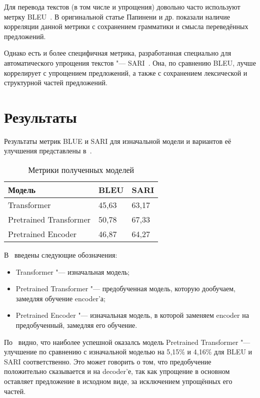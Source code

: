 Для перевода текстов (в том числе и упрощения) довольно часто используют метрку BLEU~\cite{BLEU}.
В оригинальной статье Папинени и др. показали наличие корреляции данной метрики с сохранением грамматики и смысла переведённых предложений.

Однако есть и более специфичная метрика, разработанная специально для автоматического упрощения текстов "--- SARI~\cite{SARI}.
Она, по сравнению BLEU, лучше коррелирует с упрощением предложений, а также с сохранением лексической и структурной частей предложений.


\section{Результаты}


Результаты метрик BLUE и SARI для изначальной модели и вариантов её улучшения представлены в~.

\begin{table}[H]%
  \centering\small
  \caption{Метрики полученных моделей}
  \label{metrics}
    \begin{tabular}{|l|l|l|}
      \hline
      \textbf{Модель} & \textbf{BLEU} & \textbf{SARI} \\ \hline
      Transformer & 45{,}63 & 63{,}17 \\ \hline
      Pretrained Transformer & 50{,}78 & 67{,}33 \\ \hline
      Pretrained Encoder & 46{,}87 & 64{,}27 \\ \hline
    \end{tabular}
    \normalsize
\end{table}

В~ введены следующие обозначения:
\begin{itemize}%
  \item Transformer "--- изначальная модель;
  \item Pretrained Transformer "--- предобученная модель, которую дообучаем, замедляя обучение encoder'а;
  \item Pretrained Encoder "--- изначальная модель, в которой заменяем encoder на предобученный, замедляя его обучение.
\end{itemize}

По~ видно, что наиболее успешной оказалсь модель Pretrained Transformer "--- улучшение по сравнению с изначальной моделью на 5{,}15\% и 4{,}16\% для BLEU и SARI соответственно.
Это может говорить о том, что предобучение положительно сказывается и на decoder'е, так как упрощение в основном оставляет предложение в исходном виде, за исключением упрощённых его частей.

